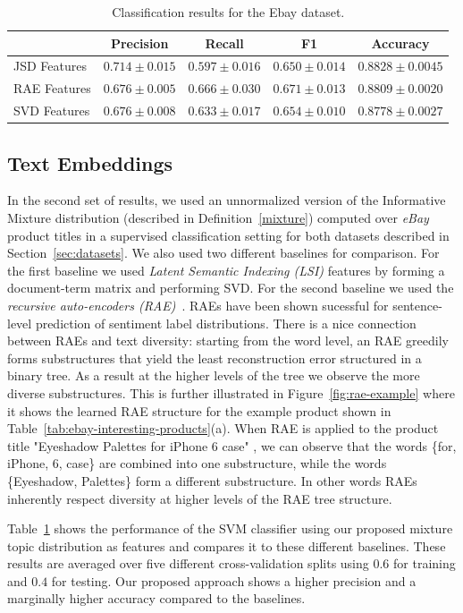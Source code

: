 \begin{table}[t]
\renewcommand{\arraystretch}{1.3}
\caption{Classification results for the Ebay dataset.}
\label{tab:classification-results}
\centering
\begin{tabular}{l||c|c|c|c}
&Precision & Recall & F1 & Accuracy
\\ \hline \hline
JSD Features         &$\mathbf{0.714}\pm 0.015$&$0.597\pm 0.016$&$0.650\pm
0.014$& $\mathbf{0.8828}\pm 0.0045$\\
RAE Features         &$0.676\pm 0.005$&$\mathbf{0.666}\pm 0.030$&$\mathbf{0.671}\pm
0.013$&$0.8809\pm 0.0020$ \\
SVD Features             &$0.676\pm 0.008$&$0.633\pm 0.017$&$0.654\pm
0.010$&$0.8778\pm 0.0027$\\
\end{tabular}
\end{table}

\subsection{Text Embeddings}
\label{sec:text-embeddings}

In the second set of results, we used an unnormalized version of the Informative Mixture
distribution (described in Definition~\ref{mixture}) computed over
{\em eBay} product titles in a supervised classification
setting for both datasets described in Section~\ref{sec:datasets}. We also used two 
different baselines for comparison. For the first baseline we used {\em Latent Semantic Indexing (LSI)} features by forming a
document-term matrix and performing SVD. For the second baseline we used the {\em recursive auto-encoders (RAE)}~\cite{Socher:2011:SRA:2145432.2145450}. RAEs 
have been shown sucessful for sentence-level prediction of sentiment label
distributions. There is a nice connection between RAEs and text diversity: starting from the word level, an RAE greedily forms substructures that yield the least reconstruction error  structured in a  binary tree. As a result at the higher levels of the tree we observe the more diverse  substructures. This is further illustrated in Figure~\ref{fig:rae-example} where it shows the learned RAE structure for the example product shown in Table~\ref{tab:ebay-interesting-products}(a). When RAE is applied to the product title "Eyeshadow Palettes for iPhone 6 case" , we can observe that the words \{for, iPhone, 6, case\} are combined into one substructure, while the words \{Eyeshadow, Palettes\} form a different substructure. In other words RAEs inherently respect diversity at higher levels of the RAE tree structure.

Table~\ref{tab:classification-results} shows
the performance of the SVM classifier using our proposed mixture topic
distribution as features and compares it to these different baselines.
These results are averaged over five different cross-validation splits using $0.6$ for training
and $0.4$ for testing. Our proposed approach shows a higher precision
and a marginally higher accuracy compared to the baselines.
